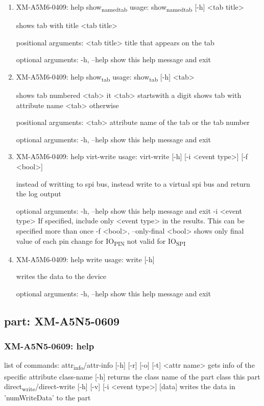 \documentclass[11pt]{article}
\begin{document}
\begin{enumerate}
\item XM-A5M6-0409: help show\textsubscript{named}\textsubscript{tab}
\label{sec:org85d48be}
usage: show\textsubscript{named}\textsubscript{tab} [-h] <tab title>

shows tab with title <tab title>

positional arguments:
  <tab title>  title that appears on the tab

optional arguments:
  -h, --help   show this help message and exit

\item XM-A5M6-0409: help show\textsubscript{tab}
\label{sec:org91f5f5e}
usage: show\textsubscript{tab} [-h] <tab>

shows tab numbered <tab> it <tab> startswith a digit shows tab with attribute
name <tab> otherwise

positional arguments:
  <tab>       attribute name of the tab or the tab number

optional arguments:
  -h, --help  show this help message and exit

\item XM-A5M6-0409: help virt-write
\label{sec:org67d91d0}
usage: virt-write [-h] [-i <event type>] [-f <bool>]

instead of writting to spi bus, instead write to a virtual spi bus and return
the log output

optional arguments:
  -h, --help            show this help message and exit
  -i <event type>       If specified, include only <event type> in the
                        results. This can be specified more than once
  -f <bool>, --only-final <bool>
                        shows only final value of each pin change for IO\textsubscript{PIN}
                        not valid for IO\textsubscript{SPI}

\item XM-A5M6-0409: help write
\label{sec:orgc6cebd7}
usage: write [-h]

writes the data to the device

optional arguments:
  -h, --help  show this help message and exit
\end{enumerate}

\subsection{part: XM-A5N5-0609}
\label{sec:org7be225f}
\subsubsection{XM-A5N5-0609: help}
\label{sec:orgbd74f0c}
list of commands:
  attr\textsubscript{info}/attr-info [-h] [-r] [-o] [-t] <attr name>
    gets info of the specific attribute
  class-name [-h]
    returns the class name of the part class this part
  direct\textsubscript{write}/direct-write [-h] [-v] [-i <event type>] [data]
    writes the data in 'numWriteData' to the part
\end{document}
